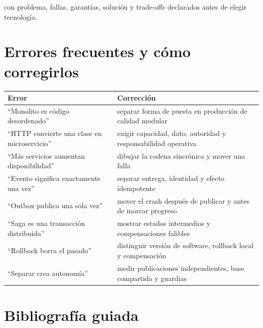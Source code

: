 \documentclass[variant=apuntes,cover=institutional,mode=screen]{ua-engineering-v6-article}
\begin{document}
con problema, fallas, garantías, solución y trade-offs declarados antes de elegir tecnología.

\section{Errores frecuentes y cómo corregirlos}

\begin{center}
\begin{tabular}{p{}p{}}
\toprule
\textbf{Error} & \textbf{Corrección} \\
\midrule
``Monolito es código desordenado'' & separar forma de puesta en producción de calidad modular \\
``HTTP convierte una clase en microservicio'' & exigir capacidad, dato, autoridad y responsabilidad operativa \\
``Más servicios aumentan disponibilidad'' & dibujar la cadena sincrónica y mover una falla \\
``Evento significa exactamente una vez'' & separar entrega, identidad y efecto idempotente \\
``Outbox publica una sola vez'' & mover el crash después de publicar y antes de marcar progreso \\
``Saga es una transacción distribuida'' & mostrar estados intermedios y compensaciones falibles \\
``Rollback borra el pasado'' & distinguir versión de software, rollback local y compensación \\
``Separar crea autonomía'' & medir publicaciones independientes, base compartida y guardias \\
\bottomrule
\end{tabular}
\end{center}

\section{Bibliografía guiada}
\end{document}
